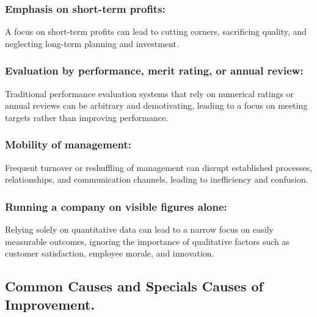 \documentclass[11pt]{article}
\begin{document}
\hypertarget{emphasis-on-short-term-profits}{%
\subsubsection{Emphasis on short-term
profits:}\label{emphasis-on-short-term-profits}}

A focus on short-term profits can lead to cutting corners, sacrificing
quality, and neglecting long-term planning and investment.

\hypertarget{evaluation-by-performance-merit-rating-or-annual-review}{%
\subsubsection{Evaluation by performance, merit rating, or annual
review:}\label{evaluation-by-performance-merit-rating-or-annual-review}}

Traditional performance evaluation systems that rely on numerical
ratings or annual reviews can be arbitrary and demotivating, leading to
a focus on meeting targets rather than improving performance.

\hypertarget{mobility-of-management}{%
\subsubsection{Mobility of management:}\label{mobility-of-management}}

Frequent turnover or reshuffling of management can disrupt established
processes, relationships, and communication channels, leading to
inefficiency and confusion.

\hypertarget{running-a-company-on-visible-figures-alone}{%
\subsubsection{Running a company on visible figures
alone:}\label{running-a-company-on-visible-figures-alone}}

Relying solely on quantitative data can lead to a narrow focus on easily
measurable outcomes, ignoring the importance of qualitative factors such
as customer satisfaction, employee morale, and innovation.

\hypertarget{common-causes-and-specials-causes-of-improvement.}{%
\subsection{Common Causes and Specials Causes of
Improvement.}\label{common-causes-and-specials-causes-of-improvement.}}
\end{document}
